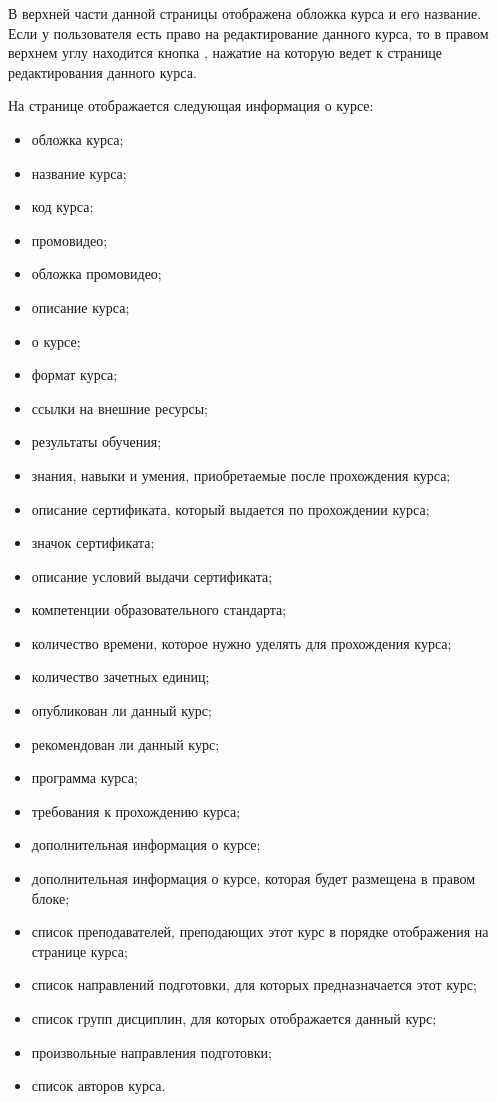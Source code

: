 В верхней части данной страницы отображена обложка курса и его название. Если у пользователя есть право на редактирование данного курса, то в правом верхнем углу находится кнопка , нажатие на которую ведет к странице редактирования данного курса.

На странице отображается следующая информация о курсе:
\begin{itemize}
	\item обложка курса;
	\item название курса;
	\item код курса;
	\item промовидео;
	\item обложка промовидео;
	\item описание курса;
	\item о курсе;
	\item формат курса;
	\item ссылки на внешние ресурсы;
	\item результаты обучения;
	\item знания, навыки и умения, приобретаемые после прохождения курса;
	\item описание сертификата, который выдается по прохождении курса;
	\item значок сертификата;
	\item описание условий выдачи сертификата;
	\item компетенции образовательного стандарта;
	\item количество времени, которое нужно уделять для прохождения курса;
	\item количество зачетных единиц;
	\item опубликован ли данный курс;
	\item рекомендован ли данный курс;
	\item программа курса;
	\item требования к прохождению курса;
	\item дополнительная информация о курсе;
	\item дополнительная информация о курсе, которая будет размещена в правом блоке;
	\item список преподавателей, преподающих этот курс в порядке отображения на странице курса;
	\item список направлений подготовки, для которых предназначается этот курс;
	\item список групп дисциплин, для которых отображается данный курс;
	\item произвольные направления подготовки;
	\item список авторов курса.
\end{itemize}

